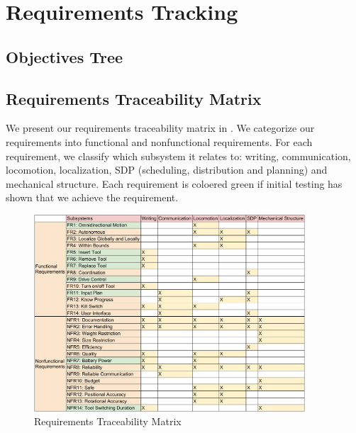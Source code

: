 \section{Requirements Tracking}
\label{sec:requirements_tracking}

\subsection{Objectives Tree}
\label{sec:objectives_tree}

\clearpage

\subsection{Requirements Traceability Matrix}
\label{sec:requirements_matrix}

We present our requirements traceability matrix in . We categorize our requirements into functional and nonfunctional requirements. For each requirement, we classify which subsystem it relates to: writing, communication, locomotion, localization, SDP (scheduling, distribution and planning) and mechanical structure. Each requirement is coloered green if initial testing has shown that we achieve the requirement. 

\begin{figure}[h!]
\centering
\includegraphics[width=0.9\textwidth]{figs/requirements_matrix.pdf}
\caption{Requirements Traceability Matrix}
\label{fig:req_matrix}
\end{figure}

\clearpage
